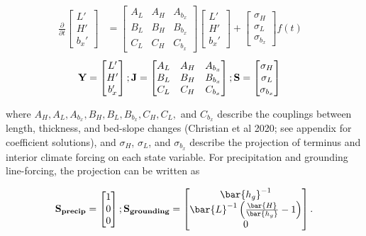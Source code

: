 \documentclass[tc, manuscript]{copernicus}
\begin{document}
\begin{align}
\frac{\partial}{\partial t}
 \begin{bmatrix} L' \\ H' \\ b_x' \end{bmatrix}
 &=
  \begin{bmatrix}
   A_L & A_H & A_{b_x}  \\
   B_L & B_H& B_{b_x} \\
   C_L & C_H & C_{b_x}
   \end{bmatrix}
    \begin{bmatrix} L' \\ H' \\ b_x' \end{bmatrix}
    +
    \begin{bmatrix} \sigma_H \\  \sigma_L \\ \sigma_{b_x} \end{bmatrix} f(t)&
\end{align}
\begin{align}
\bf{Y} = 
 \begin{bmatrix} L' \\ H' \\ b_x' \end{bmatrix};
 \bf{J}=
  \begin{bmatrix}
   A_L & A_H & A_{b_x}  \\
   B_L & B_H& B_{b_x} \\
   C_L & C_H & C_{b_x}
   \end{bmatrix};
  \bf{S}=
    \begin{bmatrix} \sigma_H \\  \sigma_L \\ \sigma_{b_x} \end{bmatrix}&
\end{align}




where $A_H, A_L, A_{b_x}, B_H, B_L, B_{b_x}, C_H, C_L,$ and $C_{b_x}$ describe the couplings between length, thickness, and bed-slope changes (Christian et al 2020; see appendix for coefficient solutions), and $\sigma_H$, $\sigma_L$, and $\sigma_{b_x}$ describe the projection of terminus and interior climate forcing on each state variable. For precipitation and grounding line-forcing, the projection can be written as

\begin{align}
\bf{S}_{precip} =   \begin{bmatrix} 1 \\ 0 \\ 0 \end{bmatrix}; \space
\bf{S}_{grounding} =   \begin{bmatrix} \bar{h_g}^{-1} \\ \bar{L}^{-1}\left(\frac{\bar{H}}{\bar{h_g}}-1\right) \\ 0 \end{bmatrix}.
\end{align}
\end{document}
